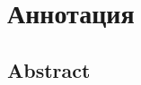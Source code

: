 \chapter*{Аннотация}


\clearpage
\begin{otherlanguage}{english}
\chapter*{Abstract}

\end{otherlanguage}
